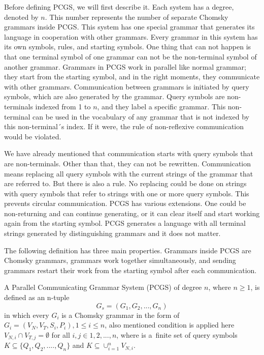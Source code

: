 Before defining PCGS, we will first describe it. Each system has a degree, denoted by $n$. This number represents the number of separate Chomsky grammars inside PCGS. This system has one special grammar that generates its language in cooperation with other grammars. Every grammar in this system has its own symbols, rules, and starting symbols. One thing that can not happen is that one terminal symbol of one grammar can not be the non-terminal symbol of another grammar. Grammars in PCGS work in parallel like normal grammar; they start from the starting symbol, and in the right moments, they communicate with other grammars. Communication between grammars is initiated by query symbols, which are also generated by the grammar. Query symbols are non-terminals indexed from 1 to $n$, and they label a specific grammar. This non-terminal can be used in the vocabulary of any grammar that is not indexed by this non-terminal´s index. If it were, the rule of non-reflexive communication would be violated.

We have already mentioned that communication starts with query symbols that are non-terminals. Other than that, they can not be rewritten. Communication means replacing all query symbols with the current strings of the grammar that are referred to. But there is also a rule. No replacing could be done on strings with query symbols that refer to strings with one or more query symbols. This prevents circular communication. PCGS has various extensions. One could be non-returning and can continue generating, or it can clear itself and start working again from the starting symbol. PCGS generates a language with all terminal strings generated by distinguishing grammars and it does not matter.

The following definition has three main properties. Grammars inside PCGS are Chomsky grammars, grammars work together simultaneously, and sending grammars restart their work from the starting symbol after each communication.

\begin{definition}
\label{Def22}
A Parallel Communicating Grammar System (PCGS) of degree $n$, where $n \geq 1$, is defined as an
n-tuple $$G_s = (G_1, G_2, ..., G_n)$$ in which every $G_i$ is a Chomsky grammar in the form of $G_i = (V_N, V_T, S_i, P_i), 1 \leq i \leq n$, also mentioned condition is applied here $V_{N,i} \cap V_{T,j} = \emptyset$ for all $i,j \in {1,2, ..., n}$, where is a~finite set of query symbols $K \subseteq \{Q_1, Q_2, ...., Q_n\}$ and $K \subseteq \cup_{i=1}^n V_{N,i}$.
\end{definition}

